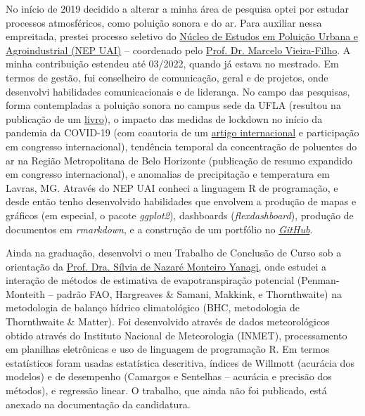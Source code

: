 \documentclass[12pt,a4paper]{article}
\begin{document}
	No início de 2019 decidido a alterar a minha área de pesquisa optei por estudar processos atmosféricos, como poluição sonora e do ar. Para auxiliar nessa empreitada, prestei processo seletivo do \href{https://sites.google.com/ufla.br/nepuai?pli=1}{Núcleo de Estudos em Poluição Urbana e Agroindustrial (NEP UAI)} – coordenado pelo \href{http://lattes.cnpq.br/5059318976988668}{Prof. Dr. Marcelo Vieira-Filho}. A minha contribuição estendeu até 03/2022, quando já estava no mestrado. Em termos de gestão, fui conselheiro de comunicação, geral e de projetos, onde desenvolvi habilidades comunicacionais e de liderança. No campo das pesquisas, forma contempladas a poluição sonora no campus sede da UFLA (resultou na publicação de um \href{https://sites.google.com/ufla.br/nepuai/publica%C3%A7%C3%B5es/livros?authuser=0}{livro}), o impacto das medidas de lockdown no início da pandemia da COVID-19 (com coautoria de um \href{https://link.springer.com/article/10.1007/s11869-020-00959-8}{artigo internacional} e participação em congresso internacional), tendência temporal da concentração de poluentes do ar na Região Metropolitana de Belo Horizonte (publicação de resumo expandido em congresso internacional), e anomalias de precipitação e temperatura em Lavras, MG. Através do NEP UAI conheci a linguagem R de programação, e desde então tenho desenvolvido habilidades que envolvem a produção de mapas e gráficos (em especial, o pacote \textit{ggplot2}), dashboards (\textit{flexdashboard}), produção de documentos em \textit{rmarkdown}, e a construção de um portfólio no \href{https://arthurboari.github.io/arthurboari/}{\textit{GitHub}}.
	
	Ainda na graduação, desenvolvi o meu Trabalho de Conclusão de Curso sob a orientação da \href{http://lattes.cnpq.br/3943657653311716}{Prof. Dra. Sílvia de Nazaré Monteiro Yanagi}, onde estudei a interação de métodos de estimativa de evapotranspiração potencial (Penman-Monteith – padrão FAO, Hargreaves \& Samani, Makkink, e Thornthwaite) na metodologia de balanço hídrico climatológico (BHC, metodologia de Thornthwaite \& Matter). Foi desenvolvido através de dados meteorológicos obtido através do Instituto Nacional de Meteorologia (INMET), processamento em planilhas eletrônicas e uso de linguagem de programação R. Em termos estatísticos foram usadas estatística descritiva, índices de Willmott (acurácia dos modelos) e de desempenho (Camargos e Sentelhas – acurácia e precisão dos métodos), e regressão linear. O trabalho, que ainda não foi publicado, está anexado na documentação da candidatura.
	
\end{document}
